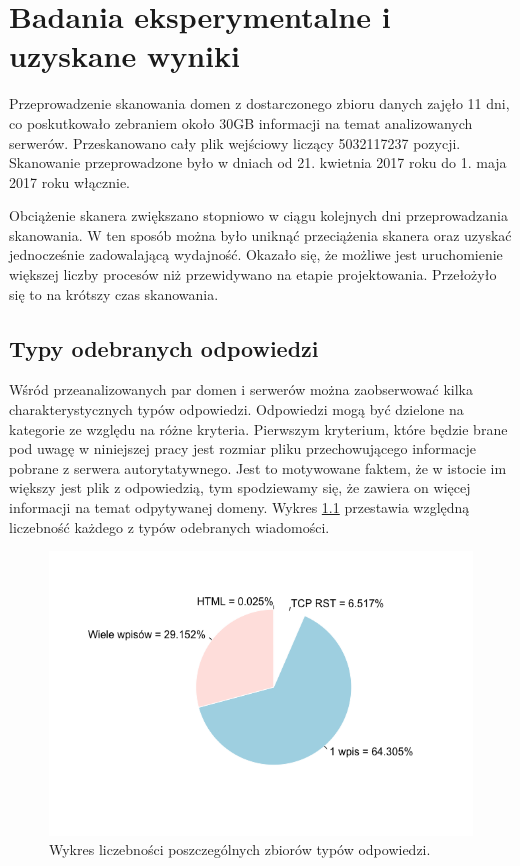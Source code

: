 \chapter{Badania eksperymentalne i uzyskane wyniki}
\noindent Przeprowadzenie skanowania domen z dostarczonego zbioru danych zajęło 11 dni, co poskutkowało zebraniem około 30GB informacji na
temat analizowanych serwerów. Przeskanowano cały plik wejściowy liczący 5032117237 pozycji. Skanowanie przeprowadzone było
w dniach od 21. kwietnia 2017 roku do 1. maja 2017 roku włącznie.

Obciążenie skanera zwiększano stopniowo w ciągu kolejnych dni przeprowadzania skanowania. W ten sposób można było uniknąć przeciążenia
skanera oraz uzyskać jednocześnie zadowalającą wydajność. Okazało się, że możliwe jest uruchomienie większej liczby procesów niż
przewidywano na etapie projektowania. Przełożyło się to na krótszy czas skanowania.

\section{Typy odebranych odpowiedzi}\label{sec:typy}
\noindent Wśród przeanalizowanych par domen i serwerów można zaobserwować kilka charakterystycznych typów odpowiedzi. Odpowiedzi mogą być
dzielone na kategorie ze względu na różne kryteria. Pierwszym kryterium, które będzie brane pod uwagę w niniejszej pracy jest
rozmiar pliku przechowującego informacje pobrane z serwera autorytatywnego. Jest to motywowane faktem, że w istocie im większy
jest plik z odpowiedzią, tym spodziewamy się, że zawiera on więcej informacji na temat odpytywanej domeny. Wykres \ref{fig:types}
przestawia względną liczebność każdego z typów odebranych wiadomości.

\begin{figure}[h!]
	\centering
	\includegraphics[width=1.0\textwidth]{image/types}
	\caption{Wykres liczebności poszczególnych zbiorów typów odpowiedzi.}
	\label{fig:types}
\end{figure}

